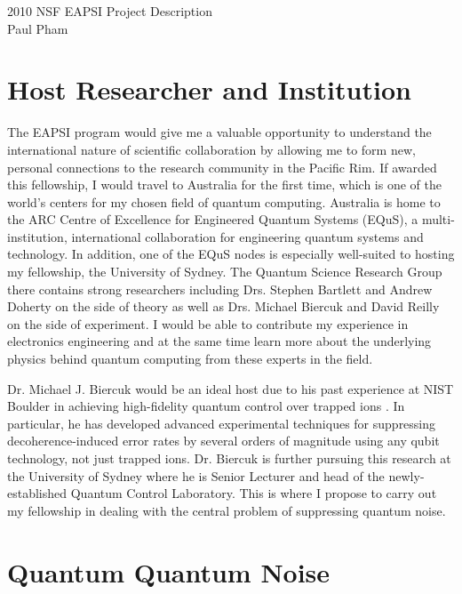 \documentclass{article}
\begin{document}
\begin{center}
\LARGE{2010 NSF EAPSI Project Description}\\
\Large{Paul Pham}
\end{center}


\section{Host Researcher and Institution}

The EAPSI program would give me a valuable opportunity to understand the
international
nature of scientific collaboration by allowing me to form new, personal
connections to the research community in the Pacific Rim.
If awarded this
fellowship, I would travel to Australia for the first time, which is one of
the world's centers for my chosen field of quantum computing. Australia is home
to the ARC Centre of Excellence for Engineered Quantum Systems (EQuS),
a multi-institution, international
collaboration for engineering quantum systems and technology.
In addition, one of the EQuS nodes is especially well-suited to hosting my
fellowship, the University of Sydney.
The Quantum Science Research Group there contains strong researchers 
including Drs. Stephen Bartlett and Andrew Doherty on the
side of theory as well as Drs. Michael Biercuk and David Reilly on the side of
experiment. I would be able to contribute my experience in electronics
engineering and at the same time learn more about the underlying physics
behind quantum computing from these experts in the field.

Dr. Michael J. Biercuk would be an ideal host due to his past experience at NIST
Boulder in achieving high-fidelity quantum control over trapped ions
\cite{BUVSIB2009a}.
In particular, he has developed advanced experimental techniques for 
suppressing decoherence-induced error rates by several orders of magnitude using
any qubit technology, not just trapped ions.
Dr. Biercuk is further pursuing this research
at the University of Sydney where he is Senior Lecturer and head of the
newly-established Quantum Control Laboratory.
This is where I propose to carry out my fellowship in
dealing with the central problem of suppressing quantum noise.

\section{Quantum Quantum Noise}
\end{document}

